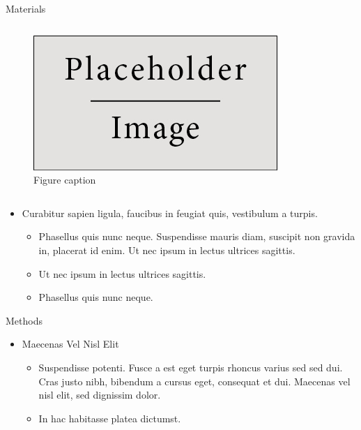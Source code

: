 \documentclass[final,hyperref={pdfpagelabels=false}]{beamer}
\begin{document}
\begin{frame}[t]
\begin{columns}[t]
\begin{column}{.465\textwidth}
\begin{block}{Materials}
\begin{columns}
\begin{column}{.43\textwidth} %
\centering
\begin{figure}
\includegraphics[width=0.8\linewidth]{placeholder.jpg}
\caption{Figure caption}
\end{figure}
\end{column}
\end{columns} %

\begin{itemize}
\item Curabitur sapien ligula, faucibus in feugiat quis, vestibulum a turpis.
\begin{itemize}
\item Phasellus quis nunc neque. Suspendisse mauris diam, suscipit non gravida in, placerat id enim. Ut nec ipsum in lectus ultrices sagittis.
\item Ut nec ipsum in lectus ultrices sagittis.
\item Phasellus quis nunc neque.
\end{itemize}
\end{itemize}

\end{block}


\begin{block}{Methods}

\begin{itemize}
\item Maecenas Vel Nisl Elit
\begin{itemize}
\item Suspendisse potenti. Fusce a est eget turpis rhoncus varius sed sed dui. Cras justo nibh, bibendum a cursus eget, consequat et dui. Maecenas vel nisl elit, sed dignissim dolor. 
\item In hac habitasse platea dictumst.
\end{itemize}


\end{itemize}
\end{block}
\end{column}
\end{columns}
\end{frame}
\end{document}
